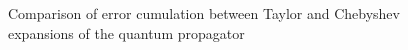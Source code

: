 \documentclass{beamer}
\begin{document}
\begin{frame}
\begin{columns}
\begin{column}{0.5\textwidth}
\begin{figure}
\caption{\footnotesize Comparison of error cumulation between Taylor and Chebyshev expansions of the quantum propagator}
\end{figure}
\end{column}
\end{columns}
\vspace{-1cm}
\end{frame}
\end{document}
